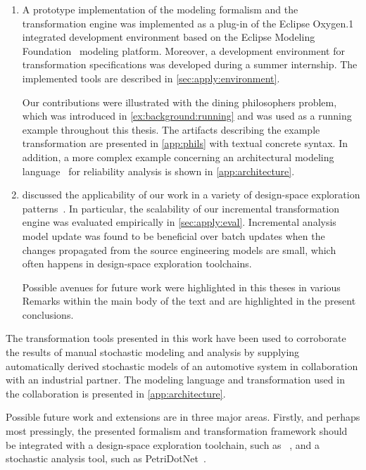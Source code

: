 \begin{enumerate}
\item A prototype implementation of the modeling formalism and the transformation engine was implemented as a plug-in of the Eclipse Oxygen.1 integrated development environment based on the Eclipse Modeling Foundation~\citep{Steinberg09emf} modeling platform. Moreover, a development environment for transformation specifications was developed during a summer internship. The implemented tools are described in \vref{sec:apply:environment}.

  Our contributions were illustrated with the dining philosophers problem, which was introduced in \vref{ex:background:running} and was used as a running example throughout this thesis. The artifacts describing the example transformation are presented in \vref{app:phils} with textual concrete syntax. In addition, a more complex example concerning an architectural modeling language~\citep{Ecsedi16architecture} for reliability analysis is shown in \vref{app:architecture}.

\item {} discussed the applicability of our work in a variety of design-space exploration patterns~\citep{Vanherpen14patterns}. In particular, the scalability of our incremental transformation engine was evaluated empirically in \vref{sec:apply:eval}. Incremental analysis model update was found to be beneficial over batch updates when the changes propagated from the source engineering models are small, which often happens in design-space exploration toolchains. 

  Possible avenues for future work were highlighted in this theses in various Remarks within the main body of the text and are highlighted in the present conclusions.
\end{enumerate}

The transformation tools presented in this work have been used to corroborate the results of manual stochastic modeling and analysis by supplying automatically derived stochastic models of an automotive system in collaboration with an industrial partner. The modeling language and transformation used in the collaboration is presented in \cref{app:architecture}.

Possible future work and extensions are in three major areas. Firstly, and perhaps most pressingly, the presented formalism and transformation framework should be integrated with a design-space exploration toolchain, such as ~\citep{Hegedus13guided}, and a stochastic analysis tool, such as PetriDotNet~\citep{Voros17pdn}.

